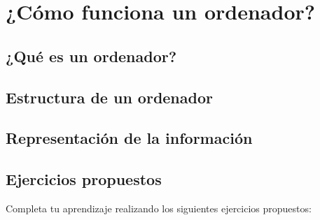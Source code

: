 
\chapter{¿Cómo funciona un ordenador?}

\section{¿Qué es un ordenador?}

\section{Estructura de un ordenador}

\section{Representación de la información}

\section{Ejercicios propuestos}

Completa tu aprendizaje realizando los siguientes ejercicios propuestos:

